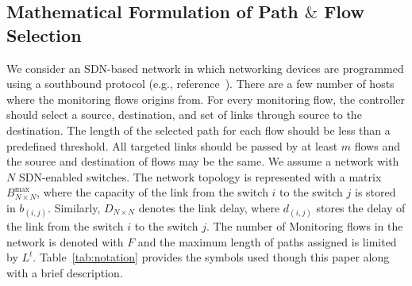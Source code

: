 \documentclass[10pt, journal, letterpaper]{IEEEtran}
\begin{document}
\subsection{Mathematical Formulation of Path $\&$ Flow Selection}\label{subsec:mathematical_formulation}
We consider an SDN-based network in which networking devices are programmed using a southbound protocol (e.g., reference~\cite{ventre2018sdn}). There are a few number of hosts where the monitoring flows origins from. For every monitoring flow, the controller should select a source, destination, and set of links through source to the destination. The length of the selected path for each flow should be less than a predefined threshold. All targeted links should be passed by at least $m$ flows and the source and destination of flows may be the same. We assume a network with $N$ SDN-enabled switches. The network topology is represented with a matrix $B^{\max}_{N\times N}$, where the capacity of the link from the switch $i$ to the switch $j$ is stored in $b_{(i,j)}$. Similarly, $D_{N\times N}$ denotes the link delay, where $d_{(i,j)}$ stores the delay of the link from the switch $i$ to the switch $j$. The number of Monitoring flows in the network is denoted with $F$ and the maximum length of paths assigned is limited by $L^t$. Table~\ref{tab:notation} provides the symbols used though this paper along with a brief description.
\end{document}
